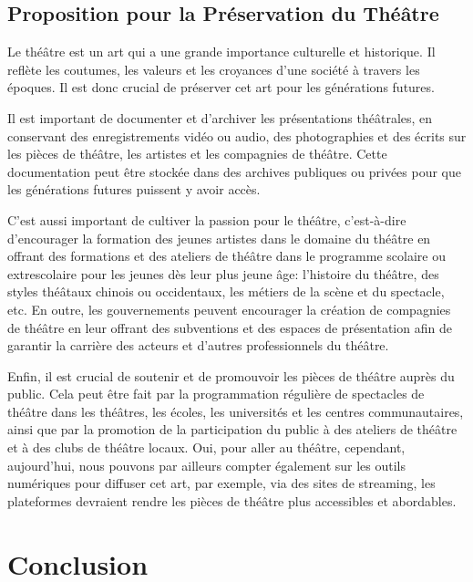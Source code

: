\documentclass[UTF8,a4paper,12pt]{ctexart}
\numberwithin{equation}{section}
\begin{document}
\subsection{Proposition pour la Préservation du Théâtre}
Le théâtre est un art qui a une grande importance culturelle et historique. Il reflète les coutumes, les valeurs et les croyances d'une société à travers les époques. Il est donc crucial de préserver cet art pour les générations futures.

Il est important de documenter et d'archiver les présentations théâtrales, en conservant des enregistrements vidéo ou audio, des photographies et des écrits sur les pièces de théâtre, les artistes et les compagnies de théâtre. Cette documentation peut être stockée dans des archives publiques ou privées pour que les générations futures puissent y avoir accès.

C'est aussi important de cultiver la passion pour le théâtre, c'est-à-dire d'encourager la formation des jeunes artistes dans le domaine du théâtre en offrant des formations et des ateliers de théâtre dans le programme scolaire ou extrescolaire pour les jeunes dès leur plus jeune âge: l’histoire du théâtre, des styles théâtaux chinois ou occidentaux, les métiers de la scène et du spectacle, etc. En outre, les gouvernements peuvent encourager la création de compagnies de théâtre en leur offrant des subventions et des espaces de présentation afin de garantir la carrière des acteurs et d'autres professionnels du théâtre. 

Enfin, il est crucial de soutenir et de promouvoir les pièces de théâtre auprès du public. Cela peut être fait par la programmation régulière de spectacles de théâtre dans les théâtres, les écoles, les universités et les centres communautaires, ainsi que par la promotion de la participation du public à des ateliers de théâtre et à des clubs de théâtre locaux. Oui, pour aller au théâtre, cependant, aujourd'hui, nous pouvons par ailleurs compter également sur les outils numériques pour diffuser cet art, par exemple, via des sites de streaming, les plateformes devraient rendre les pièces de théâtre plus accessibles et abordables.

\newpage
{}
\section*{Conclusion}
\end{document}
